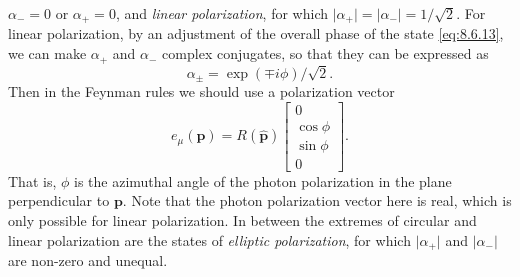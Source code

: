 $\alpha_-=0$ or $\alpha_+=0$, and \emph{linear polarization}, for which
$\lvert\alpha_+\rvert=\lvert\alpha_-\rvert=1/\sqrt2$. For linear
polarization, by an adjustment of the overall phase of the state \eqref{eq:8.6.13}, we
can make $\alpha_+$ and $\alpha_-$ complex conjugates, so that they can be
expressed as
\begin{equation}
\alpha_\pm=\exp(\mp i\phi)/\sqrt2.
\tag{8.6.18}\label{eq:8.6.18}
\end{equation}
Then in the Feynman rules we should use a polarization vector
\begin{equation}
e_\mu(\mathbf p)=R(\widehat{\mathbf p})
\begin{bmatrix}
0\\[1pt]\cos\phi\\[1pt]\sin\phi\\[1pt]0
\end{bmatrix}.
\tag{8.6.19}\label{eq:8.6.19}
\end{equation}
That is, $\phi$ is the azimuthal angle of the photon polarization in the plane
perpendicular to $\mathbf p$. Note that the photon polarization vector here is
real, which is only possible for linear polarization. In between the extremes
of circular and linear polarization are the states of \emph{elliptic
polarization}, for which $\lvert\alpha_+\rvert$ and
$\lvert\alpha_-\rvert$ are non-zero and unequal.

